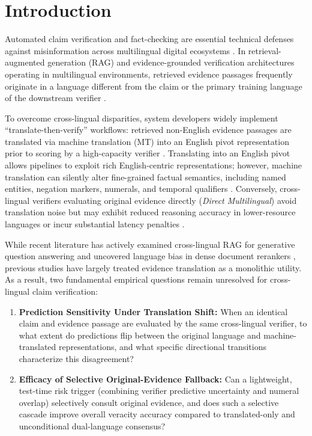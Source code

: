 \section{Introduction}
\label{sec:intro}

Automated claim verification and fact-checking are essential technical defenses against misinformation across multilingual digital ecosystems \citep{thorne-etal-2018-fever,gupta-srikumar-2021-xfact}. In retrieval-augmented generation (RAG) and evidence-grounded verification architectures operating in multilingual environments, retrieved evidence passages frequently originate in a language different from the claim or the primary training language of the downstream verifier \citep{lewis-etal-2020-rag,liu-etal-2025-xrag}.

To overcome cross-lingual disparities, system developers widely implement ``translate-then-verify'' workflows: retrieved non-English evidence passages are translated via machine translation (MT) into an English pivot representation prior to scoring by a high-capacity verifier \citep{ranaldi-etal-2026-multilingual,singhal-etal-2024-comparative}. Translating into an English pivot allows pipelines to exploit rich English-centric representations; however, machine translation can silently alter fine-grained factual semantics, including named entities, negation markers, numerals, and temporal qualifiers \citep{singhal-etal-2024-comparative}. Conversely, cross-lingual verifiers evaluating original evidence directly (\emph{Direct Multilingual}) avoid translation noise but may exhibit reduced reasoning accuracy in lower-resource languages or incur substantial latency penalties \citep{wang-etal-2026-languages,conneau-etal-2020-unsupervised}.

While recent literature has actively examined cross-lingual RAG for generative question answering \citep{liu-etal-2025-xrag,ranaldi-etal-2026-multilingual} and uncovered language bias in dense document rerankers \citep{wang-etal-2026-languages}, previous studies have largely treated evidence translation as a monolithic utility. As a result, two fundamental empirical questions remain unresolved for cross-lingual claim verification:
\begin{enumerate}
    \item \textbf{Prediction Sensitivity Under Translation Shift:} When an identical claim and evidence passage are evaluated by the same cross-lingual verifier, to what extent do predictions flip between the original language and machine-translated representations, and what specific directional transitions characterize this disagreement?
    \item \textbf{Efficacy of Selective Original-Evidence Fallback:} Can a lightweight, test-time risk trigger (combining verifier predictive uncertainty and numeral overlap) selectively consult original evidence, and does such a selective cascade improve overall veracity accuracy compared to translated-only and unconditional dual-language consensus?
\end{enumerate}

